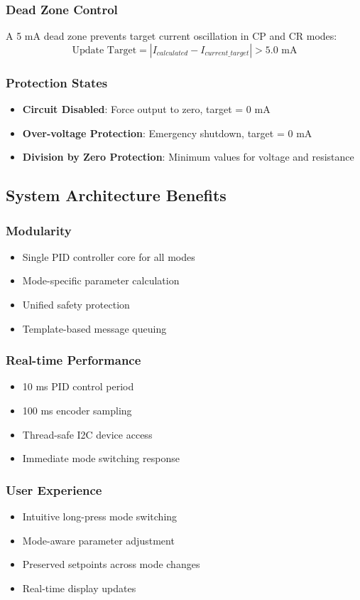 \documentclass{article}
\begin{document}
\subsubsection{Dead Zone Control}
A 5 mA dead zone prevents target current oscillation in CP and CR modes:
\begin{equation}
\text{Update Target} = |I_{calculated} - I_{current\_target}| > 5.0 \text{ mA}
\end{equation}

\subsubsection{Protection States}
\begin{itemize}
    \item \textbf{Circuit Disabled}: Force output to zero, target = 0 mA
    \item \textbf{Over-voltage Protection}: Emergency shutdown, target = 0 mA
    \item \textbf{Division by Zero Protection}: Minimum values for voltage and resistance
\end{itemize}

\subsection{System Architecture Benefits}

\subsubsection{Modularity}
\begin{itemize}
    \item Single PID controller core for all modes
    \item Mode-specific parameter calculation
    \item Unified safety protection
    \item Template-based message queuing
\end{itemize}

\subsubsection{Real-time Performance}
\begin{itemize}
    \item 10 ms PID control period
    \item 100 ms encoder sampling
    \item Thread-safe I2C device access
    \item Immediate mode switching response
\end{itemize}

\subsubsection{User Experience}
\begin{itemize}
    \item Intuitive long-press mode switching
    \item Mode-aware parameter adjustment
    \item Preserved setpoints across mode changes
    \item Real-time display updates
\end{itemize}
\end{document}
